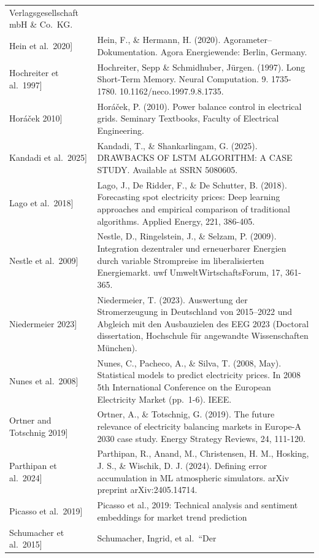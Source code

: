 \documentclass[a4paper]{article}
\begin{document}
{\begin{longtable}[]{@{}
  >{\raggedright\arraybackslash}p{}
  >{\raggedright\arraybackslash}p{}@{}}
Verlagsgesellschaft mbH \& Co.~KG. \\
{[}Hein et al.~2020{]} & Hein, F., \& Hermann, H. (2020).
Agorameter--Dokumentation. Agora Energiewende: Berlin, Germany. \\
{[}Hochreiter et al.~1997{]} & Hochreiter, Sepp \& Schmidhuber, Jürgen.
(1997). Long Short-Term Memory. Neural Computation. 9. 1735-1780.
10.1162/neco.1997.9.8.1735. \\
{[}Horáček 2010{]} & Horáček, P. (2010). Power balance control in
electrical grids. Seminary Textbooks, Faculty of Electrical
Engineering. \\
{[}Kandadi et al.~2025{]} & Kandadi, T., \& Shankarlingam, G. (2025).
DRAWBACKS OF LSTM ALGORITHM: A CASE STUDY. Available at SSRN 5080605. \\
{[}Lago et al.~2018{]} & Lago, J., De Ridder, F., \& De Schutter, B.
(2018). Forecasting spot electricity prices: Deep learning approaches
and empirical comparison of traditional algorithms. Applied Energy, 221,
386-405. \\
{[}Nestle et al.~2009{]} & Nestle, D., Ringelstein, J., \& Selzam, P.
(2009). Integration dezentraler und erneuerbarer Energien durch variable
Strompreise im liberalisierten Energiemarkt. uwf UmweltWirtschaftsForum,
17, 361-365. \\
{[}Niedermeier 2023{]} & Niedermeier, T. (2023). Auswertung der
Stromerzeugung in Deutschland von 2015--2022 und Abgleich mit den
Ausbauzielen des EEG 2023 (Doctoral dissertation, Hochschule für
angewandte Wissenschaften München). \\
{[}Nunes et al.~2008{]} & Nunes, C., Pacheco, A., \& Silva, T. (2008,
May). Statistical models to predict electricity prices. In 2008 5th
International Conference on the European Electricity Market (pp.~1-6).
IEEE. \\
{[}Ortner and Totschnig 2019{]} & Ortner, A., \& Totschnig, G. (2019).
The future relevance of electricity balancing markets in Europe-A 2030
case study. Energy Strategy Reviews, 24, 111-120. \\
{[}Parthipan et al.~2024{]} & Parthipan, R., Anand, M., Christensen, H.
M., Hosking, J. S., \& Wischik, D. J. (2024). Defining error
accumulation in ML atmospheric simulators. arXiv preprint
arXiv:2405.14714. \\
{[}Picasso et al.~2019{]} & Picasso et al., 2019: Technical analysis and
sentiment embeddings for market trend prediction \\
{[}Schumacher et al.~2015{]} & Schumacher, Ingrid, et al.~``Der

\end{longtable}}
\end{document}
